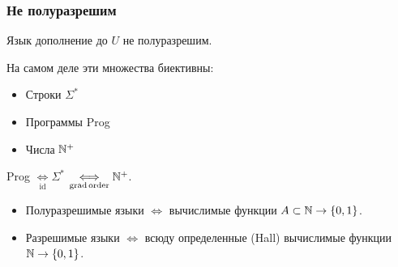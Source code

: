 \subsubsection*{Не полуразрешим}

\begin{example}
    Язык дополнение до $U$ не полуразрешим.
\end{example}

На самом деле эти множества биективны:
\begin{itemize}
    \item Строки $\Sigma^{*}$
    \item Программы Prog
    \item Числа $\mathbb{N}^+$
\end{itemize}
Prog $\underset{\mathrm{id}}{\iff} \Sigma^{*}$ $\underset{\mathrm{grad\, order}}{\iff} \mathbb{N}^+$.

\begin{itemize}
    \item Полуразрешимые языки $\iff$ вычислимые функции $A \subset \mathbb{N} \to \{0 , 1\}$.
    \item Разрешимые языки $\iff$ всюду определенные (Hall) вычислимые функции $\mathbb{N} \to \{0 , 1\}$.
\end{itemize}
